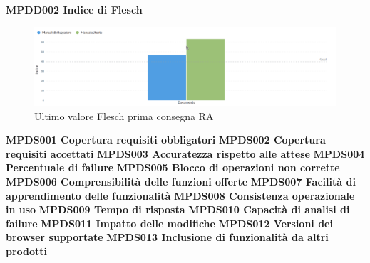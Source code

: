 \documentclass[PianoDiQualifica.tex]{subfiles}
\begin{document}
\textbf{MPDD002 Indice di Flesch}
\begin{figure}[H]
	\centering
	\includegraphics[width=1\linewidth]{RQ/flesch}
	\caption{Ultimo valore Flesch prima consegna RA}
	\label{fig:processi}
\end{figure}

\textbf{MPDS001 Copertura requisiti obbligatori}
\textbf{MPDS002 Copertura requisiti accettati}
\textbf{MPDS003 Accuratezza rispetto alle attese}
\textbf{MPDS004 Percentuale di failure}
\textbf{MPDS005 Blocco di operazioni non corrette}
\textbf{MPDS006 Comprensibilità delle funzioni offerte}
\textbf{MPDS007 Facilità di apprendimento delle funzionalità}
\textbf{MPDS008 Consistenza operazionale in uso}
\textbf{MPDS009 Tempo di risposta}
\textbf{MPDS010 Capacità di analisi di failure}
\textbf{MPDS011 Impatto delle modifiche}
\textbf{MPDS012 Versioni dei browser supportate}
\textbf{MPDS013 Inclusione di funzionalità da altri prodotti}
\end{document}
